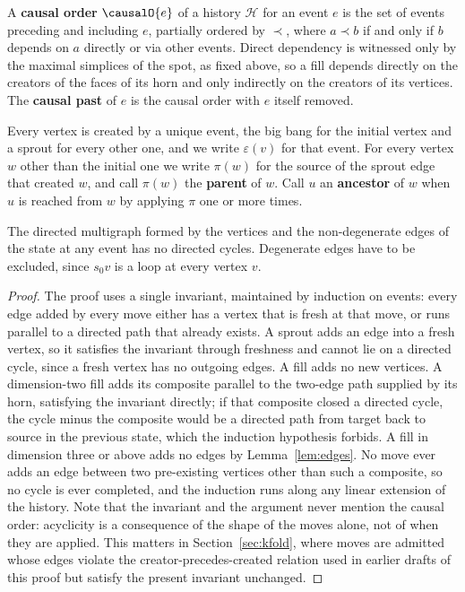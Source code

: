 \begin{definition}
\label{def:causalorder}
A \textbf{causal order} $\causalO{e}$ of a history $\mathcal{H}$ for an event $e$ is the set of events preceding and including $e$, partially ordered by $\prec$, where $a \prec b$ if and only if $b$ depends on $a$ directly or via other events. Direct dependency is witnessed only by the maximal simplices of the spot, as fixed above, so a fill depends directly on the creators of the faces of its horn and only indirectly on the creators of its vertices. The \textbf{causal past} of $e$ is the causal order with $e$ itself removed.
\end{definition}

Every vertex is created by a unique event, the big bang for the initial vertex and a sprout for every other one, and we write $\varepsilon(v)$ for that event.
For every vertex $w$ other than the initial one we write $\pi(w)$ for the source of the sprout edge that created $w$, and call $\pi(w)$ the \textbf{parent} of $w$.
Call $u$ an \textbf{ancestor} of $w$ when $u$ is reached from $w$ by applying $\pi$ one or more times.

\begin{lemma}
\label{lem:acyclic}
The directed multigraph formed by the vertices and the non-degenerate edges of the state at any event has no directed cycles.
Degenerate edges have to be excluded, since $s_0 v$ is a loop at every vertex $v$.
\end{lemma}

\begin{proof}
The proof uses a single invariant, maintained by induction on events: every edge added by every move either has a vertex that is fresh at that move, or runs parallel to a directed path that already exists.
A sprout adds an edge into a fresh vertex, so it satisfies the invariant through freshness and cannot lie on a directed cycle, since a fresh vertex has no outgoing edges.
A fill adds no new vertices.
A dimension-two fill adds its composite parallel to the two-edge path supplied by its horn, satisfying the invariant directly; if that composite closed a directed cycle, the cycle minus the composite would be a directed path from target back to source in the previous state, which the induction hypothesis forbids.
A fill in dimension three or above adds no edges by Lemma~\ref{lem:edges}.
No move ever adds an edge between two pre-existing vertices other than such a composite, so no cycle is ever completed, and the induction runs along any linear extension of the history.
Note that the invariant and the argument never mention the causal order: acyclicity is a consequence of the shape of the moves alone, not of when they are applied.
This matters in Section~\ref{sec:kfold}, where moves are admitted whose edges violate the creator-precedes-created relation used in earlier drafts of this proof but satisfy the present invariant unchanged.
\end{proof}


